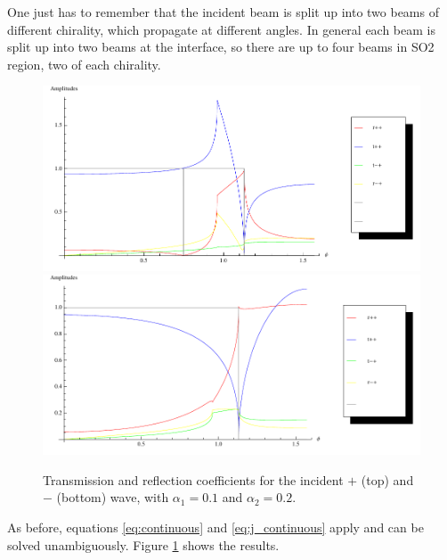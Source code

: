 \documentclass[11pt]{article}
\begin{document}
One just has to remember that the incident beam is split up
into two beams of different chirality, which propagate at different
angles. In general each beam is split up into two beams at the
interface, so there are up to four beams in SO2 region, two of each
chirality.

\begin{figure}
    \begin{center}
        \includegraphics{nonzero-plus.pdf}
        \includegraphics{nonzero-minus.pdf}
    \end{center}
    \caption{Transmission and reflection coefficients for the
        incident $+$ (top) and $-$ (bottom) wave, with
        $\alpha_1 = 0.1$ and $\alpha_2 = 0.2$.}
    \label{fig:plots-nonzero}
\end{figure}

As before, equations \ref{eq:continuous} and \ref{eq:j_continuous}
apply and can be solved unambiguously. Figure \ref{fig:plots-nonzero}
shows the results.
\end{document}
